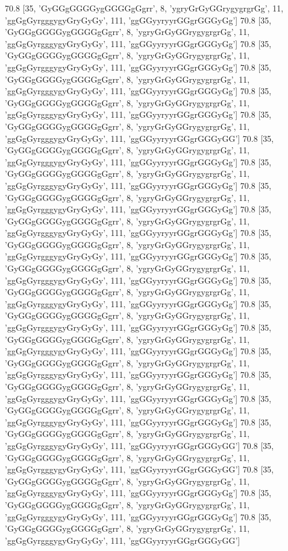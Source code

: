 70.8 [35, 'GyGGgGGGGygGGGGgGgrr', 8, 'ygryGrGyGGrygygrgrGg', 11, 'ggGgGyrgggygyGryGyGy', 111, 'ggGGyyryyrGGgrGGGyGg']
70.8 [35, 'GyGGgGGGGygGGGGgGgrr', 8, 'ygryGrGyGGrygygrgrGg', 11, 'ggGgGyrgggygyGryGyGy', 111, 'ggGGyyryyrGGgrGGGyGg']
70.8 [35, 'GyGGgGGGGygGGGGgGgrr', 8, 'ygryGrGyGGrygygrgrGg', 11, 'ggGgGyrgggygyGryGyGy', 111, 'ggGGyyryyrGGgrGGGyGg']
70.8 [35, 'GyGGgGGGGygGGGGgGgrr', 8, 'ygryGrGyGGrygygrgrGg', 11, 'ggGgGyrgggygyGryGyGy', 111, 'ggGGyyryyrGGgrGGGyGg']
70.8 [35, 'GyGGgGGGGygGGGGgGgrr', 8, 'ygryGrGyGGrygygrgrGg', 11, 'ggGgGyrgggygyGryGyGy', 111, 'ggGGyyryyrGGgrGGGyGg']
70.8 [35, 'GyGGgGGGGygGGGGgGgrr', 8, 'ygryGrGyGGrygygrgrGg', 11, 'ggGgGyrgggygyGryGyGy', 111, 'ggGGyyryyrGGgrGGGyGG']
70.8 [35, 'GyGGgGGGGygGGGGgGgrr', 8, 'ygryGrGyGGrygygrgrGg', 11, 'ggGgGyrgggygyGryGyGy', 111, 'ggGGyyryyrGGgrGGGyGg']
70.8 [35, 'GyGGgGGGGygGGGGgGgrr', 8, 'ygryGrGyGGrygygrgrGg', 11, 'ggGgGyrgggygyGryGyGy', 111, 'ggGGyyryyrGGgrGGGyGg']
70.8 [35, 'GyGGgGGGGygGGGGgGgrr', 8, 'ygryGrGyGGrygygrgrGg', 11, 'ggGgGyrgggygyGryGyGy', 111, 'ggGGyyryyrGGgrGGGyGg']
70.8 [35, 'GyGGgGGGGygGGGGgGgrr', 8, 'ygryGrGyGGrygygrgrGg', 11, 'ggGgGyrgggygyGryGyGy', 111, 'ggGGyyryyrGGgrGGGyGg']
70.8 [35, 'GyGGgGGGGygGGGGgGgrr', 8, 'ygryGrGyGGrygygrgrGg', 11, 'ggGgGyrgggygyGryGyGy', 111, 'ggGGyyryyrGGgrGGGyGg']
70.8 [35, 'GyGGgGGGGygGGGGgGgrr', 8, 'ygryGrGyGGrygygrgrGg', 11, 'ggGgGyrgggygyGryGyGy', 111, 'ggGGyyryyrGGgrGGGyGg']
70.8 [35, 'GyGGgGGGGygGGGGgGgrr', 8, 'ygryGrGyGGrygygrgrGg', 11, 'ggGgGyrgggygyGryGyGy', 111, 'ggGGyyryyrGGgrGGGyGg']
70.8 [35, 'GyGGgGGGGygGGGGgGgrr', 8, 'ygryGrGyGGrygygrgrGg', 11, 'ggGgGyrgggygyGryGyGy', 111, 'ggGGyyryyrGGgrGGGyGg']
70.8 [35, 'GyGGgGGGGygGGGGgGgrr', 8, 'ygryGrGyGGrygygrgrGg', 11, 'ggGgGyrgggygyGryGyGy', 111, 'ggGGyyryyrGGgrGGGyGg']
70.8 [35, 'GyGGgGGGGygGGGGgGgrr', 8, 'ygryGrGyGGrygygrgrGg', 11, 'ggGgGyrgggygyGryGyGy', 111, 'ggGGyyryyrGGgrGGGyGg']
70.8 [35, 'GyGGgGGGGygGGGGgGgrr', 8, 'ygryGrGyGGrygygrgrGg', 11, 'ggGgGyrgggygyGryGyGy', 111, 'ggGGyyryyrGGgrGGGyGg']
70.8 [35, 'GyGGgGGGGygGGGGgGgrr', 8, 'ygryGrGyGGrygygrgrGg', 11, 'ggGgGyrgggygyGryGyGy', 111, 'ggGGyyryyrGGgrGGGyGg']
70.8 [35, 'GyGGgGGGGygGGGGgGgrr', 8, 'ygryGrGyGGrygygrgrGg', 11, 'ggGgGyrgggygyGryGyGy', 111, 'ggGGyyryyrGGgrGGGyGG']
70.8 [35, 'GyGGgGGGGygGGGGgGgrr', 8, 'ygryGrGyGGrygygrgrGg', 11, 'ggGgGyrgggygyGryGyGy', 111, 'ggGGyyryyrGGgrGGGyGG']
70.8 [35, 'GyGGgGGGGygGGGGgGgrr', 8, 'ygryGrGyGGrygygrgrGg', 11, 'ggGgGyrgggygyGryGyGy', 111, 'ggGGyyryyrGGgrGGGyGg']
70.8 [35, 'GyGGgGGGGygGGGGgGgrr', 8, 'ygryGrGyGGrygygrgrGg', 11, 'ggGgGyrgggygyGryGyGy', 111, 'ggGGyyryyrGGgrGGGyGg']
70.8 [35, 'GyGGgGGGGygGGGGgGgrr', 8, 'ygryGrGyGGrygygrgrGg', 11, 'ggGgGyrgggygyGryGyGy', 111, 'ggGGyyryyrGGgrGGGyGG']
